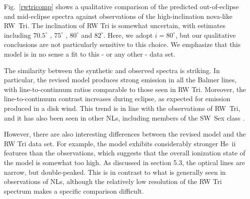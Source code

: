 \documentclass[preprint, a4paper, 11pt]{aastex}
\begin{document}
Fig.~\ref{rwtricomp} shows a qualitative comparison of the predicted
out-of-eclipse and mid-eclipse spectra against observations of the
high-inclination nova-like RW~Tri. The inclination of RW Tri is
somewhat uncertain, with estimates including $70.5^\circ$
\citep{smak1995}, $75^\circ$ \citep{groot2004}, $80^\circ$
\citep{longmore1981} and $82^\circ$\citep{frankking1981}. Here, we
adopt $i = 80^\circ$, but our qualitative conclusions are not
particularly sensitive to this choice. We emphasize that this
model is in no sense a fit to this - or any other - data set.


The similarity between the synthetic and observed spectra is
striking. In particular, the revised model produces strong emission in
all the Balmer lines, with line-to-continuum ratios comparable to
those seen in RW Tri. Moreover, the line-to-continuum contrast
increases during eclipse, as expected for emission produced in a disk
wind. This trend is in line with the observations of RW~Tri, and it
has also been seen in other NLs, including members of the SW~Sex class
\citep{neustroev2011}.

However, there are also interesting differences between the revised
model and the RW Tri data set. For example, the model exhibits
considerably stronger He~{\sc ii} features than the observations,
which suggests that the overall ionization state of the model is
somewhat too high. 
As discussed in section 5.3, the optical lines are
narrow, but double-peaked. 
This is in contrast to what is generally seen in observations
of NLs, although the relatively low resolution of the RW Tri
spectrum makes a specific comparison difficult.
\end{document}
